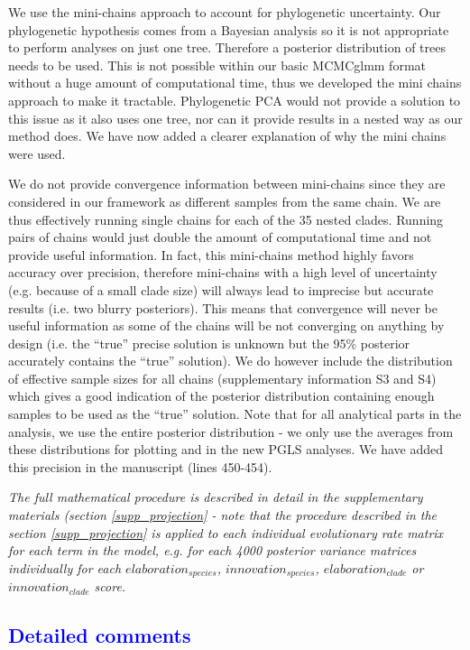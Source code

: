 \documentclass[12pt,letterpaper]{article}
\begin{document}
{We use the mini-chains approach to account for phylogenetic uncertainty. Our phylogenetic hypothesis comes from a Bayesian analysis so it is not appropriate to perform analyses on just one tree. Therefore a posterior distribution of trees needs to be used. This is not possible within our basic MCMCglmm format without a huge amount of computational time, thus we developed the mini chains approach to make it tractable. Phylogenetic PCA would not provide a solution to this issue as it also uses one tree, nor can it provide results in a nested way as our method does. We have now added a clearer explanation of why the mini chains were used.

We do not provide convergence information between mini-chains since they are considered in our framework as different samples from the same chain. We are thus effectively running single chains for each of the 35 nested clades. Running pairs of chains would just double the amount of computational time and not provide useful information. In fact, this mini-chains method highly favors accuracy over precision, therefore mini-chains with a high level of uncertainty (e.g. because of a small clade size) will always lead to imprecise but accurate results (i.e. two blurry posteriors). This means that convergence will never be useful information as some of the chains will be not converging on anything by design (i.e. the “true” precise solution is unknown but the 95\% posterior accurately contains the “true” solution). We do however include the distribution of effective sample sizes for all chains (supplementary information S3 and S4) which gives a good indication of the posterior distribution containing enough samples to be used as the “true” solution. Note that for all analytical parts in the analysis, we use the entire posterior distribution - we only use the averages from these distributions for plotting and in the new PGLS analyses. We have added this precision in the manuscript (lines 450-454).

\noindent\textit{The full mathematical procedure is described in detail in the supplementary materials (section \ref{supp_projection} - note that the procedure described in the section \ref{supp_projection} is applied to each individual evolutionary rate matrix for each term in the model, e.g. for each 4000 posterior variance matrices individually for each $elaboration_{species}$, $innovation_{species}$, $elaboration_{clade}$ or $innovation_{clade}$ score. %
}


\subsection*{\textcolor{blue}{Detailed comments}}

}
\end{document}
